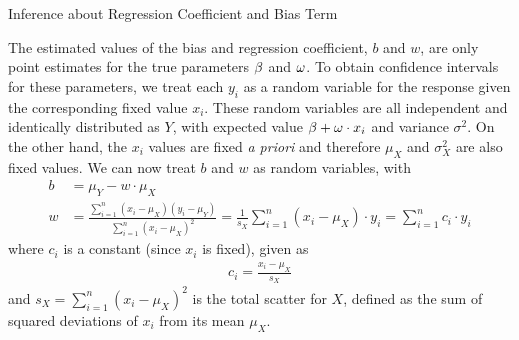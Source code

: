 %
\begin{frame}{Inference about Regression Coefficient and Bias Term}

The estimated values of the bias and regression coefficient, $b$ and $w$,
are only point estimates for the true parameters $\beta$ and $\omega$. To obtain
confidence intervals for these parameters, we treat each $y_i$ as a
random variable for the response given the corresponding fixed value
$x_i$.
These random variables are all independent and identically distributed
as $Y$, with expected value $\beta + \omega \cdot x_i$ and variance
$\sigma^2$. 
On the other hand, the $x_i$ values are fixed {\em a priori} and
therefore $\mu_X$ and $\sigma_X^2$ are also fixed values.
%
We can now treat $b$ and $w$ as random variables,
with
\begin{align*}
    b & = \mu_{Y} - w \cdot \mu_X\\
    w & = \frac{\sum^{n}_{i=1} (x_i - \mu_X)(y_{i}
    - \mu_{Y})}{ \sum^{n}_{i=1} (x_i - \mu_X)^2 } = \frac{1}{s_X} 
    \sum^{n}_{i=1} (x_i - \mu_X) \cdot y_{i}
        = \sum^{n}_{i=1} c_i \cdot y_i
\end{align*}
where $c_i$ is a constant (since $x_i$ is fixed), given as
\begin{align}
    c_i = \frac{x_i - \mu_X}{ s_X }
    \label{eq:reg:eval:ci}
\end{align}
and $s_X = \sum^{n}_{i=1} (x_i - \mu_X)^2$ is the total
scatter for $X$, defined as the sum of squared deviations of $x_i$ from
its mean $\mu_X$.
\end{frame}
%
